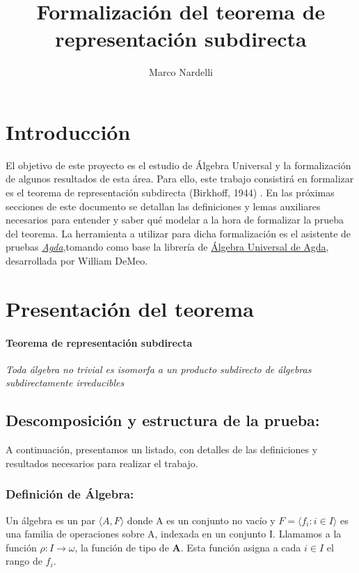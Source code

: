 \documentclass{article}
\title{Formalización del teorema de representación subdirecta}
\author{Marco Nardelli}
\begin{document}
\maketitle

\section{Introducción}
El objetivo de este proyecto es el estudio de Álgebra Universal y la formalización de algunos resultados de esta área. Para ello, este trabajo consistirá en formalizar es el teorema de representación subdirecta (Birkhoff, 1944) \cite{ref_article1}. En las próximas secciones de este documento se detallan las definiciones y lemas auxiliares necesarios para entender y saber qué modelar a la hora de formalizar la prueba del teorema. La herramienta a utilizar para dicha formalización es el asistente de pruebas \href{https://agda.readthedocs.io/en/v2.6.0.1/getting-started/what-is-agda.html}{\textit{Agda}},tomando como base la librería de \href{https://ualib.org/}{Álgebra Universal de Agda}, desarrollada por William DeMeo.

\section{Presentación del teorema}
\paragraph{Teorema de representación subdirecta}
\textit{Toda álgebra no trivial es isomorfa a un producto subdirecto de álgebras subdirectamente irreducibles}

\subsection{Descomposición y estructura de la prueba:}
A continuación, presentamos un listado, con detalles de las definiciones y resultados necesarios para realizar el trabajo. 
\subsubsection{Definición de Álgebra:}
Un álgebra es un par $\langle A, F \rangle$ donde A es un conjunto no vacío y $F = \langle f_i \colon i \in I \rangle$ es una familia de operaciones sobre A, indexada en un conjunto I.
Llamamos a la función $\rho \colon I \to \omega$, la función de tipo de \textbf{A}. Esta función asigna a cada $i \in I$ el rango de $f_i$.
\end{document}
